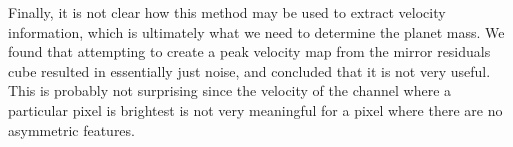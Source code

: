 Finally, it is not clear how this method may be used to extract velocity information, which is ultimately what we need to determine the planet mass.
We found that attempting to create a peak velocity map from the mirror residuals cube resulted in essentially just noise, and concluded that it is not very useful.
This is probably not surprising since the velocity of the channel where a particular pixel is brightest is not very meaningful for a pixel where there are no asymmetric features.





